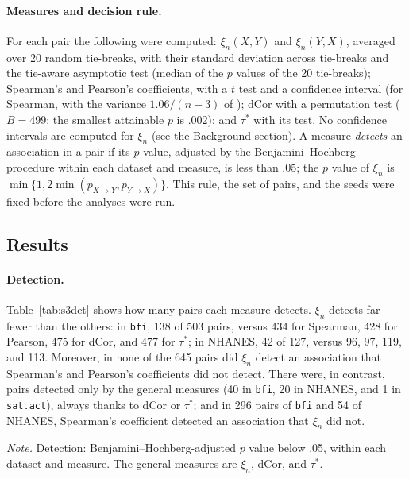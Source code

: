\documentclass[man,mask,donotrepeattitle,floatsintext]{apa7}
\begin{document}
\paragraph{Measures and decision rule.} For each pair the following were computed: $\xi_n(X,Y)$ and $\xi_n(Y,X)$, averaged over 20 random tie-breaks, with their standard deviation across tie-breaks and the tie-aware asymptotic test (median of the $p$ values of the 20 tie-breaks); Spearman's and Pearson's coefficients, with a $t$ test and a confidence interval (for Spearman, with the variance $1.06/(n-3)$ of \cite{fieller1957}); dCor with a permutation test ($B=499$; the smallest attainable $p$ is .002); and $\tau^*$ with its test. No confidence intervals are computed for $\xi_n$ (see the Background section). A measure \emph{detects} an association in a pair if its $p$ value, adjusted by the Benjamini--Hochberg procedure \parencite{benjamini1995} within each dataset and measure, is less than .05; the $p$ value of $\xi_n$ is $\min\{1,2\min(p_{X\to Y},p_{Y\to X})\}$. This rule, the set of pairs, and the seeds were fixed before the analyses were run.

\subsection{Results}

\paragraph{Detection.} Table~\ref{tab:s3det} shows how many pairs each measure detects. $\xi_n$ detects far fewer than the others: in \texttt{bfi}, 138 of 503 pairs, versus 434 for Spearman, 428 for Pearson, 475 for dCor, and 477 for $\tau^*$; in NHANES, 42 of 127, versus 96, 97, 119, and 113. Moreover, in none of the 645 pairs did $\xi_n$ detect an association that Spearman's and Pearson's coefficients did not detect. There were, in contrast, pairs detected only by the general measures (40 in \texttt{bfi}, 20 in NHANES, and 1 in \texttt{sat.act}), always thanks to dCor or $\tau^*$; and in 296 pairs of \texttt{bfi} and 54 of NHANES, Spearman's coefficient detected an association that $\xi_n$ did not.

\begin{table}
\caption{Variable Pairs in Which Each Measure Detects an Association}
\label{tab:s3det}
\begin{threeparttable}
\small

\begin{tablenotes}[flushleft]
\small
\item \textit{Note.} Detection: Benjamini--Hochberg-adjusted $p$ value below .05, within each dataset and measure. The general measures are $\xi_n$, dCor, and $\tau^*$.
\end{tablenotes}
\end{threeparttable}
\end{table}
\end{document}
